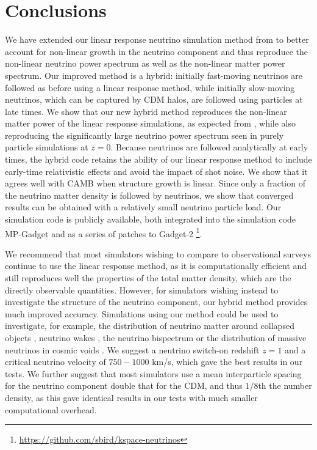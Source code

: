 \documentclass[useAMS, usenatbib]{mnras}
\begin{document}
\section{Conclusions}
\label{sec:conclusion}

We have extended our linear response neutrino simulation method from \cite{AHB} to better account for non-linear growth in the neutrino component and thus reproduce the non-linear neutrino power spectrum as well as the non-linear matter power spectrum. 
Our improved method is a hybrid: initially fast-moving neutrinos are followed as before using a linear response method, while initially slow-moving neutrinos, which can be captured by CDM halos, are followed using particles at late times. We show that our new hybrid method reproduces the non-linear matter power of the linear response simulations, as expected from \cite{AHB}, while also reproducing the significantly large neutrino power spectrum seen in purely particle simulations at $z=0$. Because neutrinos are followed analytically at early times, the hybrid code retains the ability of our linear response method to include early-time relativistic effects and avoid the impact of shot noise. We show that it agrees well with CAMB when structure growth is linear. Since only a fraction of the neutrino matter density is followed by neutrinos, we show that converged results can be obtained with a relatively small neutrino particle load. Our simulation code is publicly available, both integrated into the simulation code MP-Gadget and as a series of patches to Gadget-2 \footnote{\url{https://github.com/sbird/kspace-neutrinos}}.

We recommend that most simulators wishing to compare to observational surveys continue to use the linear response method, as it is computationally efficient and still reproduces well the properties of the total matter density, which are the directly observable quantities. However, for simulators wishing instead to investigate the structure of the neutrino component, our hybrid method provides much improved accuracy. Simulations using our method could be used to investigate, for example, the distribution of neutrino matter around collapsed objects \citep{FVN_2013}, neutrino wakes \citep{Inman_2015}, the neutrino bispectrum \citep{Furhrer_2015} or the distribution of massive neutrinos in cosmic voids \citep{Banerjee_2016}. We suggest a neutrino switch-on redshift $z=1$ and a critical neutrino velocity of $750-1000$ km/s, which gave the best results in our tests. We further suggest that most simulators use a mean interparticle spacing for the neutrino component double that for the CDM, and thus $1/8$th the number density, as this gave identical results in our tests with much smaller computational overhead.
\end{document}
